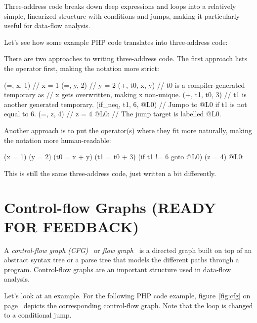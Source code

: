 Three-address code breaks down deep expressions and loops into a relatively simple, linearized structure with conditions and jumps, making it particularly useful for data-flow analysis.

Let's see how some example PHP code translates into three-address code:


There are two approaches to writing three-address code. The first approach lists the operator first, making the notation more strict:

\begin{textcode}
     (=, x, 1)            // x = 1
     (=, y, 2)            // y = 2
     (+, t0, x, y)        // t0 is a compiler-generated temporary as
                          // x gets overwritten, making x non-unique.
     (+, t1, t0, 3)       // t1 is another generated temporary.
     (if_neq, t1, 6, @L0) // Jumpo to @L0 if t1 is not equal to 6.
     (=, z, 4)            // z = 4
@L0:                      // The jump target is labelled @L0.
\end{textcode}

Another approach is to put the operator(s) where they fit more naturally, making the notation more human-readable:

\begin{textcode}
     (x = 1)
     (y = 2)
     (t0 = x + y)
     (t1 = t0 + 3)
     (if t1 != 6 goto @L0)
     (z = 4)
@L0:
\end{textcode}

This is still the same three-address code, just written a bit differently.



\section{Control-flow Graphs (READY FOR FEEDBACK)}
\label{cfg}

A \emph{control-flow graph (CFG)}~\cite{chess-west} or \emph{flow graph}~\cite{compilers} is a directed graph built on top of an abstract syntax tree or a parse tree that models the different paths through a program. Control-flow graphs are an important structure used in data-flow analysis.

Let's look at an example. For the following PHP code example, figure~\ref{fig:cfg} on page~\pageref{fig:cfg} depicts the corresponding control-flow graph. Note that the loop is changed to a conditional jump.

